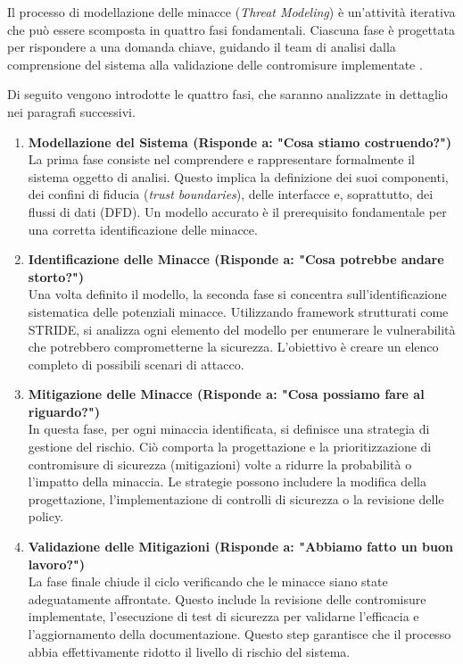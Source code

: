 


Il processo di modellazione delle minacce (\textit{Threat Modeling}) è un'attività iterativa che può essere scomposta in quattro fasi fondamentali. Ciascuna fase è progettata per rispondere a una domanda chiave, guidando il team di analisi dalla comprensione del sistema alla validazione delle contromisure implementate \cite{libro-threat-modelling-designin-for-security,agid}.

Di seguito vengono introdotte le quattro fasi, che saranno analizzate in dettaglio nei paragrafi successivi.

\begin{enumerate}
    \item \textbf{Modellazione del Sistema (Risponde a: "Cosa stiamo costruendo?")}\\ La prima fase consiste nel comprendere e rappresentare formalmente il sistema oggetto di analisi. Questo implica la definizione dei suoi componenti, dei confini di fiducia (\textit{trust boundaries}), delle interfacce e, soprattutto, dei flussi di dati (DFD). Un modello accurato è il prerequisito fondamentale per una corretta identificazione delle minacce.
    \item \textbf{Identificazione delle Minacce (Risponde a: "Cosa potrebbe andare storto?")}\\Una volta definito il modello, la seconda fase si concentra sull'identificazione sistematica delle potenziali minacce. Utilizzando framework strutturati come STRIDE, si analizza ogni elemento del modello per enumerare le vulnerabilità che potrebbero comprometterne la sicurezza. L'obiettivo è creare un elenco completo di possibili scenari di attacco.
    \item \textbf{Mitigazione delle Minacce (Risponde a: "Cosa possiamo fare al riguardo?")}\\In questa fase, per ogni minaccia identificata, si definisce una strategia di gestione del rischio. Ciò comporta la progettazione e la prioritizzazione di contromisure di sicurezza (mitigazioni) volte a ridurre la probabilità o l'impatto della minaccia. Le strategie possono includere la modifica della progettazione, l'implementazione di controlli di sicurezza o la revisione delle policy.
    \item \textbf{Validazione delle Mitigazioni (Risponde a: "Abbiamo fatto un buon lavoro?")}\\La fase finale chiude il ciclo verificando che le minacce siano state adeguatamente affrontate. Questo include la revisione delle contromisure implementate, l'esecuzione di test di sicurezza per validarne l'efficacia e l'aggiornamento della documentazione. Questo step garantisce che il processo abbia effettivamente ridotto il livello di rischio del sistema.
\end{enumerate}



